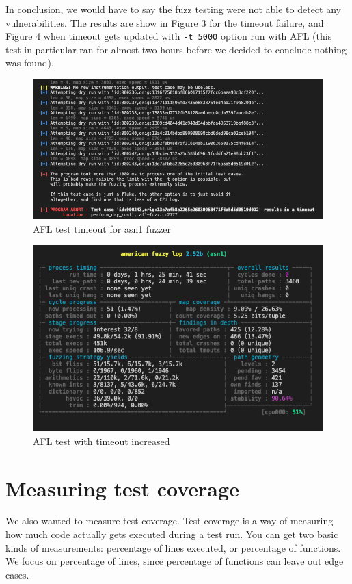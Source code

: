 \documentclass[conference]{IEEEtran}
\begin{document}
  In conclusion, we would have to say the fuzz testing were not able to detect any
vulnerabilities. The results are show in Figure 3 for
the timeout failure, and Figure 4 when timeout
gets updated with \verb|-t 5000| option run with AFL (this test in particular ran for almost two
hours before we decided to conclude nothing was found).
\begin{figure}[h]
  \caption{AFL test timeout for asn1 fuzzer}
  \centering
  \includegraphics[scale=0.3]{asn1-fuzz-failure}
\end{figure}
\begin{figure}[h]
  \caption{AFL test with timeout increased}
  \centering
  \includegraphics[scale=0.3]{asn1-fuzz-timeout}
\end{figure}

\section{Measuring test coverage}
We also wanted to measure test coverage. Test coverage is a way of
measuring how much code actually gets executed during a test run. You
can get two basic kinds of measurements: percentage of lines executed,
or percentage of functions. We focus on percentage of lines, since
percentage of functions can leave out edge cases.
\end{document}
